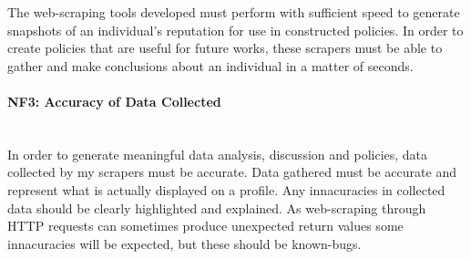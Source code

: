 \noindent The web-scraping tools developed must perform with sufficient speed to generate snapshots of an individual's reputation for use in constructed policies. In order to create policies that are useful for future works, these scrapers must be able to gather and make conclusions about an individual in a matter of seconds. 

\paragraph{NF3: Accuracy of Data Collected}\hspace{0pt} \\

\noindent In order to generate meaningful data analysis, discussion and policies, data collected by my scrapers must be accurate. Data gathered must be accurate and represent what is actually displayed on a profile. Any innacuracies in collected data should be clearly highlighted and explained. As web-scraping through HTTP requests can sometimes produce unexpected return values some innacuracies will be expected, but these should be known-bugs. 








